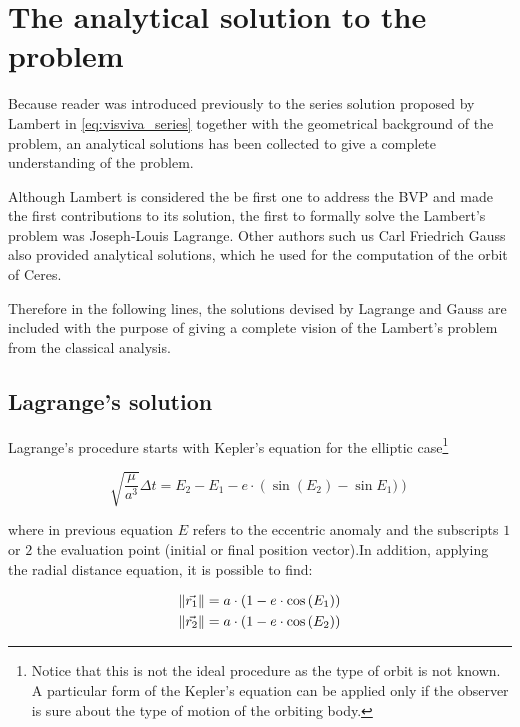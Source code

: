 \section{The analytical solution to the problem}

Because reader was introduced previously to the series solution proposed by
Lambert in \ref{eq:visviva_series} together with the geometrical background of
the problem, an analytical solutions has been collected to give a complete
understanding of the problem.

Although Lambert is considered the be first one to address the BVP and made the
first contributions to its solution, the first to formally solve the Lambert's
problem was Joseph-Louis Lagrange. Other authors such us Carl Friedrich Gauss
also provided analytical solutions, which he used for the computation of the
orbit of Ceres.

Therefore in the following lines, the solutions devised by Lagrange and Gauss
are included with the purpose of giving a complete vision of the Lambert's
problem from the classical analysis.

\subsection{Lagrange's solution}
\label{sec:lagrange_sol}

Lagrange's procedure starts with Kepler's equation for the elliptic
case\footnote{Notice that this is not the ideal procedure as the type of orbit
  is not known. A particular form of the Kepler's equation can be applied
  only if the observer is sure about the type of motion of the orbiting
  body.}

\begin{equation}
  \sqrt{\frac{\mu}{a^3}} \Delta t = E_{2} - E_{1} - e \cdot \left(\sin{(E_{2}) -\sin{E_{1}}}) \right)
  \label{eq:kepler_lagrange}
\end{equation}

where in previous equation $E$ refers to the eccentric anomaly and the
subscripts $1$ or $2$ the evaluation point (initial or final position vector).In
addition, applying the radial distance equation, it is possible to find:

\begin{align}
  \lVert\vec{r_{1}}\rVert & = a \cdot (1 - e \cdot \cos{(E_1)}) \\
  \lVert\vec{r_{2}}\rVert & = a \cdot (1 - e \cdot \cos{(E_2)}) \\
  \label{eq:radial_distances_lagrage}
\end{align}

